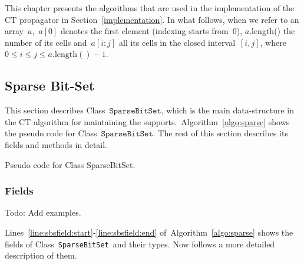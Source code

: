 \documentclass[a4paper,11pt]{article}
\newcommand{\Todo}[1]{{\color{blue}#1}}
\newcommand{\Chapref}[1]{Section~\ref{#1}}
\newcommand{\Algoref}[1]{Algorithm~\ref{#1}}
\newcommand{\Linesref}[2]{Lines~\ref{#1}-\ref{#2}}
\newcommand{\Mask}{\texttt{mask}}
\newcommand{\SparseBitSet}{\texttt{SparseBitSet}}
\newcommand{\function}[1]{\mathrm{#1}}
\numberwithin{equation}{section}
\begin{document}
This chapter presents the algorithms that are used in the implementation of the
CT propagator in \Chapref{implementation}. In what follows, when we refer to
an array~$a$,~$a[0]$ denotes the first element (indexing starts from~$0$),
$a$.length() the number of its cells and~$a[i:j]$ all its cells in the closed
interval~$[i,j]$, where~$0 \leq i \leq j \leq a.\function{length}() - 1$.

\subsection{Sparse Bit-Set}
This section describes Class~$\SparseBitSet$, which is the main data-structure
in the CT algorithm for maintaining the supports.~\Algoref{algo:sparse} shows the
pseudo code for Class~$\SparseBitSet$. The rest of this section describes its
fields and methods in detail.

\begin{algorithm}[H]
  \begin{algorithmic}[1]  %
    
    \end{algorithmic}
  \caption{Pseudo code for Class SparseBitSet.}
  \label{algo:sparse}
\end{algorithm}

\subsubsection{Fields}
\label{sbs:fields}

\Todo{Todo: Add examples.}

\Linesref{line:sbsfield:start}{line:sbsfield:end} of~\Algoref{algo:sparse} shows the fields
of Class~\SparseBitSet~and their types. Now follows a more detailed description of them.
\end{document}
